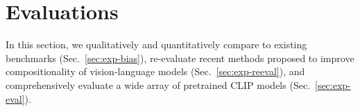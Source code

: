 
\section{Evaluations}
\label{sec:exp}


In this section, we qualitatively and quantitatively compare \method to existing benchmarks (Sec.~\ref{sec:exp-bias}), 
re-evaluate recent methods proposed to improve compositionality of vision-language models (Sec.~\ref{sec:exp-reeval}), and comprehensively evaluate a wide array of pretrained CLIP models (Sec.~\ref{sec:exp-eval}).



